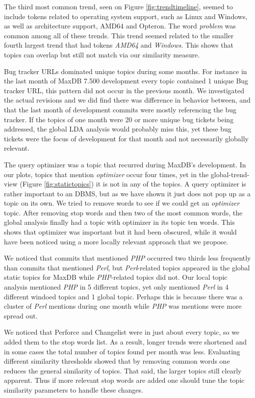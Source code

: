 \documentclass[times, 10pt,twocolumn]{article}
\begin{document}
The third most common trend, seen on Figure \ref{fig:trendtimeline},
seemed to include tokens related to operating system support, such as
Linux and Windows, as well as architecture support, AMD64 and
Opteron. The word \emph{problem} was common among all of these
trends. This trend seemed related to the smaller fourth largest trend
that had tokens \emph{AMD64} and \emph{Windows}. This shows that
topics can overlap but still not match via our similarity measure.


Bug tracker URLs dominated unique topics during some months. For
instance in the last month of MaxDB 7.500 development every topic
contained 1 unique Bug tracker URL, this pattern did not occur in the
previous month. We investigated the actual revisions and we did find
there was difference in behavior between, and that the last month of
development commits were mostly referencing the bug tracker. If the
topics of one month were 20 or more unique bug tickets being
addressed, the global LDA analysis would probably miss this, yet these
bug tickets were the focus of development for that month and not
necessarily globally relevant.

The query optimizer was a topic that recurred during MaxDB's
development. In our plots, topics that mention \emph{optimizer} occur four
times, yet in the global-trend-view (Figure \ref{fig:statictopics}) it
is not in any of the topics. A query optimizer is rather important to
an DBMS, but as we have shown it just does not pop up as a topic on
its own. We tried to remove words to see if we could get an 
\emph{optimizer} topic. After removing stop words and then two of the most
common words, the global analysis finally had a topic with optimizer in
its topic ten words. This shows that optimizer was important but it
had been obscured, while it would have been noticed using a more
locally relevant approach that we propose.

We noticed that commits that mentioned \emph{PHP} occurred two thirds
less frequently than commits that mentioned \emph{Perl}, but
\emph{Perl}-related topics appeared in the global static topics for
MaxDB while \emph{PHP}-related topics did not.  Our local topic
analysis mentioned \emph{PHP} in 5 different topics, yet only
mentioned \emph{Perl} in 4 different windoed topics and 1 global
topic. Perhaps this is because there was a cluster of \emph{Perl}
mentions during one month while \emph{PHP} was mentions were more
spread out.


We noticed that Perforce and Changelist were in just about every
topic, so we added them to the stop words list. As a result, longer
trends were shortened and in some cases the total number of topics
found per month was less.  Evaluating different similarity thresholds
showed that by removing common words one reduces the general
similarity of topics. That said, the larger topics still clearly
apparent. Thus if more relevant stop words are added one should tune
the topic similarity parameters to handle these changes.
\end{document}
